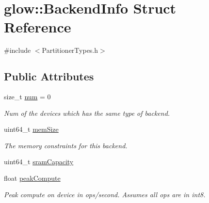 \hypertarget{structglow_1_1_backend_info}{}\section{glow\+:\+:Backend\+Info Struct Reference}
\label{structglow_1_1_backend_info}


{\ttfamily \#include $<$Partitioner\+Types.\+h$>$}

\subsection*{Public Attributes}
\begin{DoxyCompactItemize}
\item 
\mbox{\label{structglow_1_1_backend_info_ab3daa46687333b95a9626f526afed4d8}} 
size\+\_\+t \hyperlink{structglow_1_1_backend_info_ab3daa46687333b95a9626f526afed4d8}{num} = 0
\begin{DoxyCompactList}\small\item\em Num of the devices which has the same type of backend. \end{DoxyCompactList}\item 
\mbox{\label{structglow_1_1_backend_info_a6ee40a460104df903fc6ab9202bee0d1}} 
uint64\+\_\+t \hyperlink{structglow_1_1_backend_info_a6ee40a460104df903fc6ab9202bee0d1}{mem\+Size}
\begin{DoxyCompactList}\small\item\em The memory constraints for this backend. \end{DoxyCompactList}\item 
uint64\+\_\+t \hyperlink{structglow_1_1_backend_info_ad39dc08f2df27ed1e7b3ac543cb352d3}{sram\+Capacity}
\item 
\mbox{\label{structglow_1_1_backend_info_a67140de825fd4c68adda8425c2507e06}} 
float \hyperlink{structglow_1_1_backend_info_a67140de825fd4c68adda8425c2507e06}{peak\+Compute}
\begin{DoxyCompactList}\small\item\em Peak compute on device in ops/second. Assumes all ops are in int8. \end{DoxyCompactList}\item 
\mbox{\label{structglow_1_1_backend_info_a882516a34d2a6aaf02235510f2d76203}} 

\end{DoxyCompactItemize}
